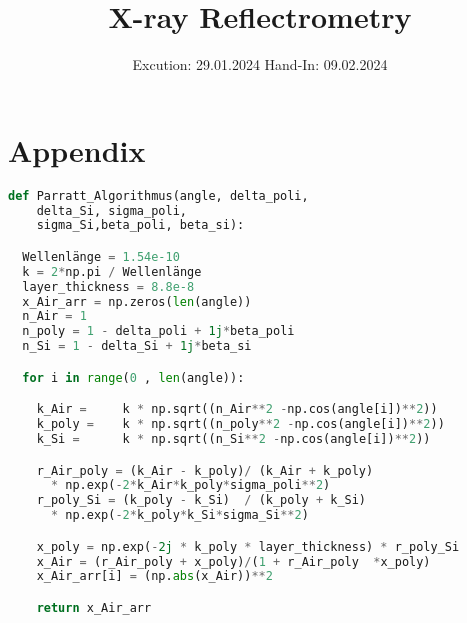 

\subject{V44}
\title{X-ray Reflectrometry}
\date{%
  Excution: 29.01.2024
  \hspace{3em}
  Hand-In: 09.02.2024
}



\maketitle
\thispagestyle{empty}
\tableofcontents
\newpage
\setcounter{page}{1}







\printbibliography{}

\newpage

\section*{Appendix}
\begin{lstlisting}[language=python, caption=Parrat\_Algorithm]
def Parratt_Algorithmus(angle, delta_poli, 
    delta_Si, sigma_poli, 
    sigma_Si,beta_poli, beta_si):

  Wellenlänge = 1.54e-10
  k = 2*np.pi / Wellenlänge
  layer_thickness = 8.8e-8
  x_Air_arr = np.zeros(len(angle))
  n_Air = 1
  n_poly = 1 - delta_poli + 1j*beta_poli
  n_Si = 1 - delta_Si + 1j*beta_si

  for i in range(0 , len(angle)):

    k_Air =     k * np.sqrt((n_Air**2 -np.cos(angle[i])**2))
    k_poly =    k * np.sqrt((n_poly**2 -np.cos(angle[i])**2))
    k_Si =      k * np.sqrt((n_Si**2 -np.cos(angle[i])**2))

    r_Air_poly = (k_Air - k_poly)/ (k_Air + k_poly)
      * np.exp(-2*k_Air*k_poly*sigma_poli**2)
    r_poly_Si = (k_poly - k_Si)  / (k_poly + k_Si) 
      * np.exp(-2*k_poly*k_Si*sigma_Si**2)

    x_poly = np.exp(-2j * k_poly * layer_thickness) * r_poly_Si
    x_Air = (r_Air_poly + x_poly)/(1 + r_Air_poly  *x_poly)
    x_Air_arr[i] = (np.abs(x_Air))**2

    return x_Air_arr
\end{lstlisting}


